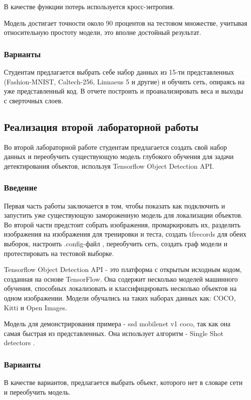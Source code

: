 В качестве функции потерь используется кросс-энтропия.

Модель достигает точности около 90 процентов на тестовом множестве, учитывая относительную простоту модели, это вполне достойный результат. 

\subsubsection{Варианты}
Студентам предлагается выбрать себе набор данных из 15-ти представленных (Fashion-MNIST, Caltech-256, Linnaeus 5 и другие) и обучить сеть, опираясь на уже представленный код. В отчете построить и проанализировать веса и выходы с сверточных слоев.






\subsection{Реализация второй лабораторной работы}
Во второй лабораторной работе студентам предлагается создать свой набор данных и переобучить существующую модель глубокого обучения для задачи детектирования объектов, используя Tensorflow Object Detection API. 

\subsubsection{Введение}

Первая часть работы заключается в том, чтобы показать как подключить и запустить уже существующую замороженную модель для локализации объектов. Во второй части предстоит собрать изображения, промаркировать их, разделить изображения на изображения для тренировки и теста, создать tfrecords для обеих выборок, настроить .config-файл , переобучить сеть, создать граф модели и протестировать на тестовой выборке.

Tensorflow Object Detection API - это платформа с открытым исходным кодом, созданная на основе TensorFlow. Она содержит несколько моделей машинного обучения, способных локализовать и классифицировать несколько объектов на одном изображении. Модели обучались на таких наборах данных как: COCO,  Kitti и  Open Images.

Модель для демонстрирования примера - ssd mobilenet v1 coco, так как она самая быстрая из представленных. Она использует алгоритм - Single Shot detectors \cite{SSD}.

\subsubsection{Варианты}
В качестве вариантов, предлагается выбрать объект, которого нет в словаре сети и переобучить модель.












